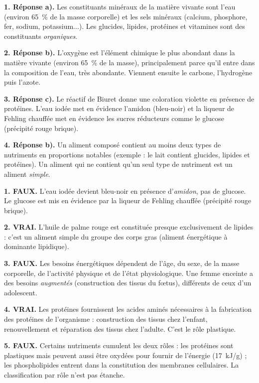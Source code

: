 \documentclass[11pt]{article}
\newcommand{\cle}[1]{{\popxbold\color{popdark}#1}}
\begin{document}
\begin{corrige}
\textbf{1. Réponse a).} Les constituants \cle{minéraux} de la matière vivante sont l'\cle{eau} (environ \SI{65}{\%} de la masse corporelle) et les \cle{sels minéraux} (calcium, phosphore, fer, sodium, potassium...). Les glucides, lipides, protéines et vitamines sont des constituants \emph{organiques}.

\textbf{2. Réponse b).} L'\cle{oxygène} est l'élément chimique le plus abondant dans la matière vivante (environ \SI{65}{\%} de la masse), principalement parce qu'il entre dans la composition de l'eau, très abondante. Viennent ensuite le carbone, l'hydrogène puis l'azote.

\textbf{3. Réponse c).} Le \cle{réactif de Biuret} donne une coloration violette en présence de protéines. L'\cle{eau iodée} met en évidence l'amidon (bleu-noir) et la \cle{liqueur de Fehling} chauffée met en évidence les sucres réducteurs comme le glucose (précipité rouge brique).

\textbf{4. Réponse b).} Un \cle{aliment composé} contient au moins deux types de nutriments en proportions notables (exemple : le lait contient glucides, lipides et protéines). Un aliment qui ne contient qu'un seul type de nutriment est un aliment \emph{simple}.
\end{corrige}

\begin{corrige}
\textbf{1. FAUX.} L'eau iodée devient bleu-noir en présence d'\emph{amidon}, pas de glucose. Le glucose est mis en évidence par la liqueur de Fehling chauffée (précipité rouge brique).

\textbf{2. VRAI.} L'huile de palme rouge est constituée presque exclusivement de lipides : c'est un aliment simple du groupe des corps gras (aliment énergétique à dominante lipidique).

\textbf{3. FAUX.} Les besoins énergétiques dépendent de l'âge, du sexe, de la masse corporelle, de l'activité physique et de l'état physiologique. Une femme enceinte a des besoins \emph{augmentés} (construction des tissus du fœtus), différents de ceux d'un adolescent.

\textbf{4. VRAI.} Les protéines fournissent les acides aminés nécessaires à la fabrication des protéines de l'organisme : construction des tissus chez l'enfant, renouvellement et réparation des tissus chez l'adulte. C'est le \cle{rôle plastique}.

\textbf{5. FAUX.} Certains nutriments cumulent les deux rôles : les protéines sont plastiques mais peuvent aussi être oxydées pour fournir de l'énergie (\SI{17}{kJ/g}) ; les \cle{phospholipides} entrent dans la constitution des membranes cellulaires. La classification par rôle n'est pas étanche.
\end{corrige}
\end{document}
